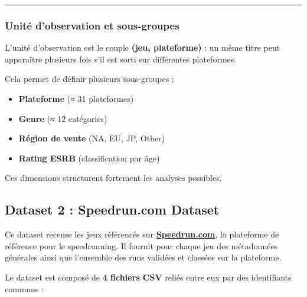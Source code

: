 \documentclass[
]{article}
\providecommand{\tightlist}{%
  \setlength{\itemsep}{0pt}\setlength{\parskip}{0pt}}
\begin{document}
\begin{center}\rule{0.5\linewidth}{0.5pt}\end{center}

\subsubsection{Unité d'observation et
sous-groupes}\label{unituxe9-dobservation-et-sous-groupes}

L'unité d'observation est le couple \textbf{(jeu, plateforme)} : un même
titre peut apparaître plusieurs fois s'il est sorti sur différentes
plateformes.

Cela permet de définir plusieurs sous-groupes :

\begin{itemize}
\tightlist
\item
  \textbf{Plateforme} (≈ 31 plateformes)\\
\item
  \textbf{Genre} (≈ 12 catégories)\\
\item
  \textbf{Région de vente} (NA, EU, JP, Other)\\
\item
  \textbf{Rating ESRB} (classification par âge)
\end{itemize}

Ces dimensions structurent fortement les analyses possibles.

\subsection{Dataset 2 : Speedrun.com
Dataset}\label{dataset-2-speedrun.com-dataset}

Ce dataset recense les jeux référencés sur
\href{https://www.speedrun.com/}{\textbf{Speedrun.com}}, la plateforme
de référence pour le speedrunning. Il fournit pour chaque jeu des
métadonnées générales ainsi que l'ensemble des runs validées et classées
sur la plateforme.

Le dataset est composé de \textbf{4 fichiers CSV} reliés entre eux par
des identifiants communs :
\end{document}
